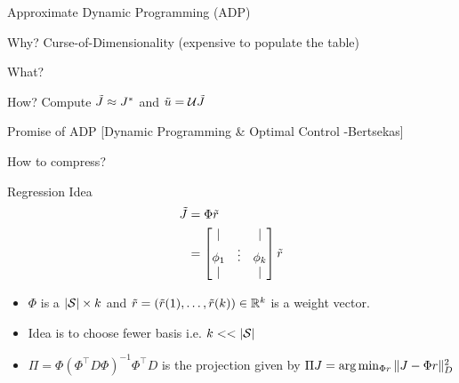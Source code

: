 \documentclass[10pt,handout]{beamer}
\begin{document}
\begin{frame}[fragile]{Approximate Dynamic Programming (ADP)}
\begin{block}{Why?}
Curse-of-Dimensionality (expensive to populate the table)
\end{block}
\begin{block}{What?}
{\color{orange}{ADP= Compression + DP}}
\end{block}
\begin{block}{How?}
Compute $\tj\approx J^*$ and $\tu=\U \tj$
\end{block}
\begin{block}{Promise of ADP [Dynamic Programming \& Optimal Control -Bertsekas]}
{}
\end{block}
\end{frame}




\begin{frame}[fragile]{How to compress?}
\begin{block}{Regression Idea}
\begin{align*}
\tilde{J}&=\Phi \tr \\
&=\begin{bmatrix}\lvert& &\lvert  \\ \phi_1& \vdots& \phi_k\\ \lvert& & \lvert  \\ \end{bmatrix} \tr
\end{align*}
\end{block}
\begin{itemize}
\item $\Phi$ is a $|\S|\times k $ {\color{orange}{feature matrix}} and $\tr=(\tr(1),\ldots,\tr(k))\in \R^k$ is a weight vector.
\item Idea is to choose fewer basis i.e. $k<<|\S|$
\item $\Pi=\Phi (\Phi^\top D \Phi)^{-1}\Phi^\top D$ is the projection given by $\Pi J =\arg\min_{\Phi r}\norm{J-\Phi r}^2_D$
\end{itemize}

\end{frame}
\end{document}
